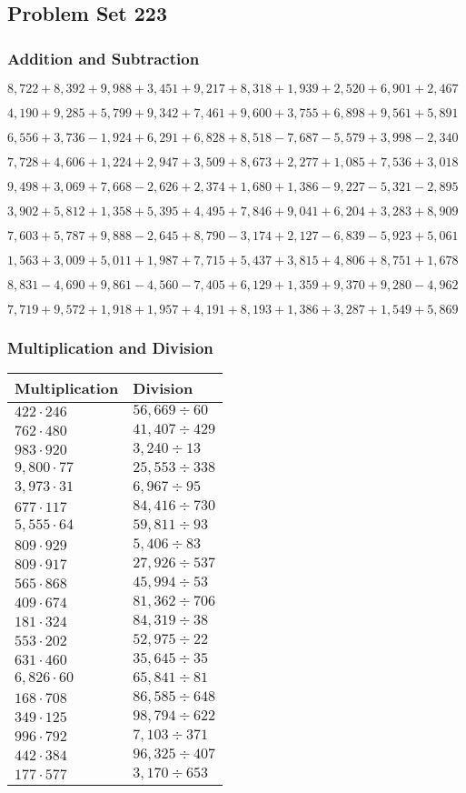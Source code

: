 \hypertarget{problem-set-223}{%
\subsection{Problem Set 223}\label{problem-set-223}}

\hypertarget{addition-and-subtraction}{%
\subsubsection{Addition and
Subtraction}\label{addition-and-subtraction}}

\(8,722+8,392+9,988+3,451+9,217+8,318+1,939+2,520+6,901+2,467\)

\(4,190+9,285+5,799+9,342+7,461+9,600+3,755+6,898+9,561+5,891\)

\(6,556+3,736-1,924+6,291+6,828+8,518-7,687-5,579+3,998-2,340\)

\(7,728+4,606+1,224+2,947+3,509+8,673+2,277+1,085+7,536+3,018\)

\(9,498+3,069+7,668-2,626+2,374+1,680+1,386-9,227-5,321-2,895\)

\(3,902+5,812+1,358+5,395+4,495+7,846+9,041+6,204+3,283+8,909\)

\(7,603+5,787+9,888-2,645+8,790-3,174+2,127-6,839-5,923+5,061\)

\(1,563+3,009+5,011+1,987+7,715+5,437+3,815+4,806+8,751+1,678\)

\(8,831-4,690+9,861-4,560-7,405+6,129+1,359+9,370+9,280-4,962\)

\(7,719+9,572+1,918+1,957+4,191+8,193+1,386+3,287+1,549+5,869\)

\hypertarget{multiplication-and-division}{%
\subsubsection{Multiplication and
Division}\label{multiplication-and-division}}

\begin{longtable}[]{@{}ll@{}}
\toprule
Multiplication & Division\tabularnewline
\midrule
\endhead
\(422\cdot246\) & \(56,669÷60\)\tabularnewline
\(762\cdot480\) & \(41,407÷429\)\tabularnewline
\(983\cdot920\) & \(3,240÷13\)\tabularnewline
\(9,800\cdot77\) & \(25,553÷338\)\tabularnewline
\(3,973\cdot31\) & \(6,967÷95\)\tabularnewline
\(677\cdot117\) & \(84,416÷730\)\tabularnewline
\(5,555\cdot64\) & \(59,811÷93\)\tabularnewline
\(809\cdot929\) & \(5,406÷83\)\tabularnewline
\(809\cdot917\) & \(27,926÷537\)\tabularnewline
\(565\cdot868\) & \(45,994÷53\)\tabularnewline
\(409\cdot674\) & \(81,362÷706\)\tabularnewline
\(181\cdot324\) & \(84,319÷38\)\tabularnewline
\(553\cdot202\) & \(52,975÷22\)\tabularnewline
\(631\cdot460\) & \(35,645÷35\)\tabularnewline
\(6,826\cdot60\) & \(65,841÷81\)\tabularnewline
\(168\cdot708\) & \(86,585÷648\)\tabularnewline
\(349\cdot125\) & \(98,794÷622\)\tabularnewline
\(996\cdot792\) & \(7,103÷371\)\tabularnewline
\(442\cdot384\) & \(96,325÷407\)\tabularnewline
\(177\cdot577\) & \(3,170÷653\)\tabularnewline
\bottomrule
\end{longtable}

